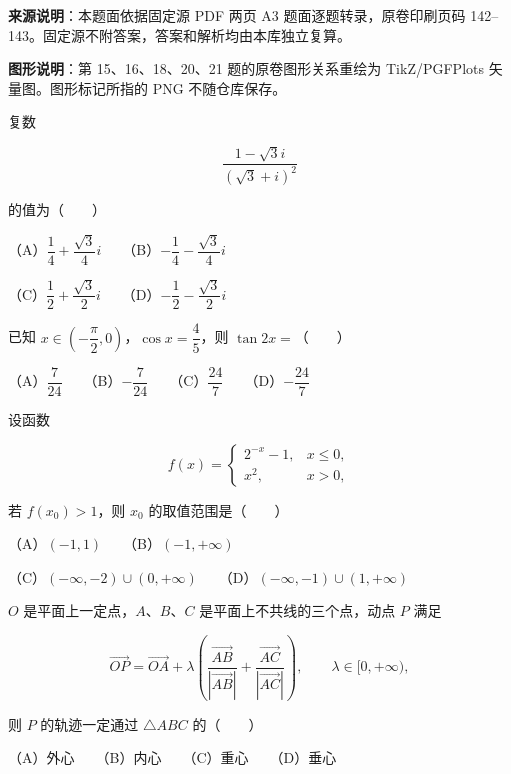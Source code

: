 


\begin{gktip}
\textbf{来源说明}：本题面依据固定源 PDF 两页 A3 题面逐题转录，原卷印刷页码 142–143。固定源不附答案，答案和解析均由本库独立复算。

\textbf{图形说明}：第 15、16、18、20、21 题的原卷图形关系重绘为 TikZ/PGFPlots 矢量图。图形标记所指的 PNG 不随仓库保存。
\end{gktip}


\begin{question}
复数

\nopagebreak[4]
\[
\frac{1-\sqrt3 i}{(\sqrt3+i)^2}
\]

的值为\mbox{（　　）}

（A）$\dfrac14+\dfrac{\sqrt3}{4}i$　　（B）$-\dfrac14-\dfrac{\sqrt3}{4}i$

（C）$\dfrac12+\dfrac{\sqrt3}{2}i$　　（D）$-\dfrac12-\dfrac{\sqrt3}{2}i$

\end{question}
\begin{question}
已知 $x\in\left(-\dfrac\pi2,0\right)$，$\cos x=\dfrac45$，则 $\tan2x=$\mbox{（　　）}

（A）$\dfrac7{24}$　　（B）$-\dfrac7{24}$　　（C）$\dfrac{24}{7}$　　（D）$-\dfrac{24}{7}$

\end{question}
\begin{question}
设函数

\nopagebreak[4]
\[
f(x)=
\begin{cases}
2^{-x}-1,&x\leqslant0,\\
x^2,&x>0,
\end{cases}
\]

若 $f(x_0)>1$，则 $x_0$ 的取值范围是\mbox{（　　）}

（A）$(-1,1)$　　（B）$(-1,+\infty)$

（C）$(-\infty,-2)\cup(0,+\infty)$　　（D）$(-\infty,-1)\cup(1,+\infty)$

\end{question}
\begin{question}
$O$ 是平面上一定点，$A\text{、}B\text{、}C$ 是平面上不共线的三个点，动点 $P$ 满足

\nopagebreak[4]
\[
\overrightarrow{OP}
=\overrightarrow{OA}
+\lambda\left(
\frac{\overrightarrow{AB}}{|\overrightarrow{AB}|}
+\frac{\overrightarrow{AC}}{|\overrightarrow{AC}|}
\right),\qquad \lambda\in[0,+\infty),
\]

则 $P$ 的轨迹一定通过 $\triangle ABC$ 的\mbox{（　　）}

（A）外心　　（B）内心　　（C）重心　　（D）垂心

\end{question}
